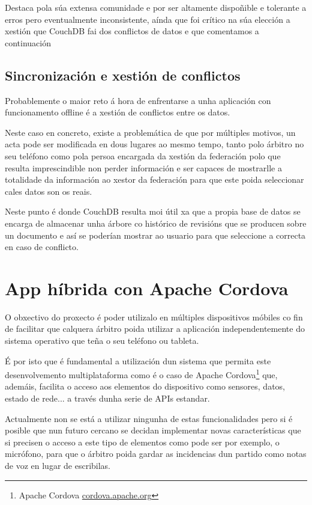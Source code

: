     Destaca pola súa extensa comunidade e por ser altamente dispoñible e 
tolerante a erros pero eventualmente inconsistente, aínda que foi crítico na 
súa elección a xestión que CouchDB fai dos conflictos de datos e que comentamos 
a continuación

    \subsection{Sincronización e xestión de conflictos}
    Probablemente o maior reto á hora de enfrentarse a unha aplicación con 
funcionamento offline é a xestión de conflictos entre os datos.

    Neste caso en concreto, existe a problemática de que por múltiples 
motivos, un acta pode ser modificada en dous lugares ao mesmo tempo, tanto polo 
árbitro no seu teléfono como pola persoa encargada da xestión da federación
polo que resulta imprescindible non perder información e ser capaces de 
mostrarlle a totalidade da información ao xestor da federación para que este 
poida seleccionar cales datos son os reais.

    Neste punto é donde CouchDB resulta moi útil xa que a propia base de datos 
se encarga de almacenar unha árbore co histórico de revisións que se producen 
sobre un documento e así se poderían mostrar ao usuario para que seleccione a 
correcta en caso de conflicto.

  \section{App híbrida con Apache Cordova}
  O obxectivo do proxecto é poder utilizalo en múltiples dispositivos móbiles 
co fin de facilitar que calquera árbitro poida utilizar a aplicación 
independentemente do sistema operativo que teña o seu teléfono ou tableta.

  É por isto que é fundamental a utilización dun sistema que permita este 
desenvolvemento multiplataforma como é o caso de Apache 
Cordova\footnote{Apache Cordova 
\href{https://cordova.apache.org/}{cordova.apache.org}} que, ademáis, 
facilita o acceso aos elementos do dispositivo como sensores, datos, estado de 
rede... a través dunha serie de APIs estandar.

  Actualmente non se está a utilizar ningunha de estas funcionalidades pero si 
é posible que nun futuro cercano se decidan implementar novas características 
que si precisen o acceso a este tipo de elementos como pode ser por exemplo, o 
micrófono, para que o árbitro poida gardar as incidencias dun partido como 
notas de voz en lugar de escribilas.

